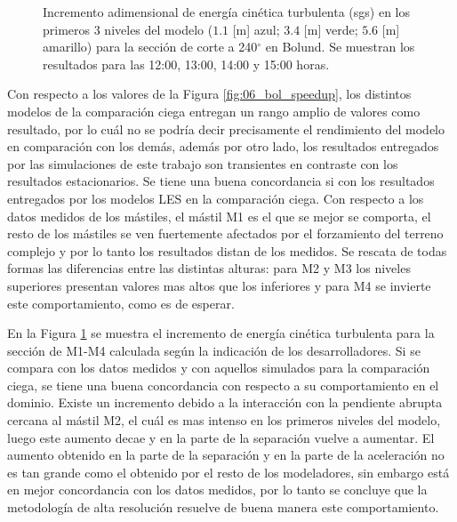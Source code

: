 \begin{figure}[H]
	\caption{Incremento adimensional de energía cinética turbulenta (sgs) en los primeros 3 niveles del modelo ($1.1$ [m] azul; $3.4$ [m] verde; $5.6$ [m] amarillo) para la sección de corte a 240$^\circ$ en Bolund. Se muestran los resultados para las 12:00, 13:00, 14:00 y 15:00 horas.}
	\label{fig:06_bol_tke}
\end{figure}
Con respecto a los valores de la Figura \ref{fig:06_bol_speedup}, los distintos modelos de la comparación ciega entregan un rango amplio de valores como resultado, por lo cuál no se podría decir precisamente el rendimiento del modelo en comparación con los demás, además por otro lado, los resultados entregados por las simulaciones de este trabajo son transientes en contraste con los resultados estacionarios. Se tiene una buena concordancia si con los resultados entregados por los modelos LES en la comparación ciega. Con respecto a los datos medidos de los mástiles, el mástil M1 es el que se mejor se comporta, el resto de los mástiles se ven fuertemente afectados por el forzamiento del terreno complejo y por lo tanto los resultados distan de los medidos. Se rescata de todas formas las diferencias entre las distintas alturas: para M2 y M3 los niveles superiores presentan valores mas altos que los inferiores y para M4 se invierte este comportamiento, como es de esperar. 

En la Figura \ref{fig:06_bol_tke} se muestra el incremento de energía cinética turbulenta para la sección de M1-M4 calculada según la indicación de los desarrolladores. Si se compara con los datos medidos y con aquellos simulados para la comparación ciega, se tiene una buena concordancia con respecto a su comportamiento en el dominio. Existe un incremento debido a la interacción con la pendiente abrupta cercana al mástil M2, el cuál es mas intenso en los primeros niveles del modelo, luego este aumento decae y en la parte de la separación vuelve a aumentar. El aumento obtenido en la parte de la separación y en la parte de la aceleración no es tan grande como el obtenido por el resto de los modeladores, sin embargo está en mejor concordancia con los datos medidos, por lo tanto se concluye que la metodología de alta resolución resuelve de buena manera este comportamiento.

